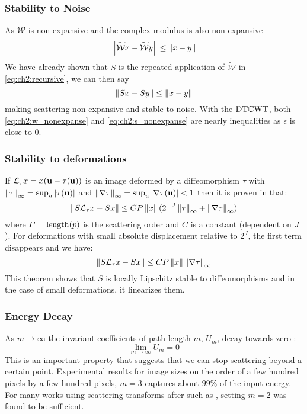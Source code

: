 \subsubsection{Stability to Noise}
As $\mathcal{W}$ is non-expansive and the complex modulus is also non-expansive
\begin{equation}
  \left\lVert \widetilde{\mathcal{W}}x - \widetilde{\mathcal{W}}y \right\rVert \leq \left\lVert x-y \right\rVert \label{eq:ch2:w_nonexpanse}
\end{equation}
We have already shown that $S$ is the repeated application of $\widetilde{\mathcal{W}}$ in
\eqref{eq:ch2:recursive}, we can then say
\begin{equation}
  \left\lVert Sx - Sy \right\rVert \leq \left\lVert x-y \right\rVert\label{eq:ch2:s_nonexpanse}
\end{equation}
making scattering non-expansive and stable to noise. With the $\mathrm{DT}\mathbb{C}\mathrm{WT}$, both
\eqref{eq:ch2:w_nonexpanse} and \eqref{eq:ch2:s_nonexpanse} are nearly
inequalities as $\epsilon$ is close to 0.

\subsubsection{Stability to deformations}
If $\mathcal{L}_\tau x = x(\mathbf{u} -\tau(\mathbf{u}))$ is an image deformed
by a diffeomorphism $\tau$ with $\left\lVert \tau \right\rVert_\infty = \sup_u |\tau(\mathbf{u})|$
and $\left\lVert \nabla \tau \right\rVert_\infty = \sup_u |\nabla \tau(\mathbf{u})| < 1$ then it is
proven in \cite{mallat_group_2012} that:
%
\begin{equation}
  \left\lVert  S \mathcal{L}_{\tau}x  - S x \right\rVert \leq C P \left\lVert x \right\rVert (2^{-J}\left\lVert \tau \right\rVert_\infty + \left\lVert \nabla \tau \right\rVert_\infty )
\end{equation}
%
where $P = \mathrm{length}(p)$ is the scattering order and $C$ is a constant
(dependent on $J$). For deformations with small absolute displacement relative
to $2^J$, the first term disappears and we have:
\begin{equation}
  \left\lVert  S \mathcal{L}_{\tau}x  - S x \right\rVert \leq C P \left\lVert x \right\rVert \left\lVert \nabla \tau \right\rVert_\infty  \label{eq:ch2:stability}
\end{equation}
This theorem shows that $S$ is locally Lipschitz stable to diffeomorphisms and in
the case of small deformations, it linearizes them.

\subsubsection{Energy Decay}
As $m \rightarrow \infty$ the invariant coefficients of path length $m$, $U_m$,
decay towards zero \cite{mallat_group_2012}:
\begin{equation}
  \lim_{m \rightarrow \infty} U_m = 0
\end{equation}
This is an important property that suggests that we can stop scattering beyond a
certain point. Experimental results \cite{bruna_invariant_2013} for
image sizes on the order of a few hundred pixels by a few
hundred pixels, $m=3$ captures about $99\%$ of the input energy. For many works
using scattering transforms after \cite{bruna_invariant_2013} such as
\cite{oyallon_deep_2015, oyallon_scaling_2017}, setting
$m=2$ was found to be sufficient.

